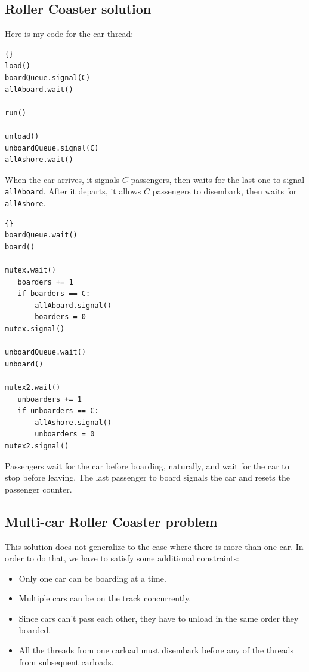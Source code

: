 \documentclass{book}
\newcommand{\clearemptydoublepage}{\newpage\cleardoublepage}
\begin{document}
\clearemptydoublepage
\subsection{Roller Coaster solution}

Here is my code for the car thread:

\begin{lstlisting}[caption={Roller Coaster solution (car)}]{}
load()
boardQueue.signal(C)
allAboard.wait()

run()

unload()
unboardQueue.signal(C)
allAshore.wait()
\end{lstlisting}

When the car arrives, it signals $C$ passengers,
then waits for the last one to signal {\tt allAboard}.
After it departs, it allows $C$ passengers to disembark,
then waits for {\tt allAshore}.

\begin{lstlisting}[caption={Roller Coaster solution (passenger)}]{}
boardQueue.wait()
board()

mutex.wait()
   boarders += 1
   if boarders == C:
       allAboard.signal()
       boarders = 0
mutex.signal()

unboardQueue.wait()
unboard()

mutex2.wait()
   unboarders += 1
   if unboarders == C:
       allAshore.signal()
       unboarders = 0
mutex2.signal()
\end{lstlisting}

Passengers wait for the car before boarding, naturally, and wait for
the car to stop before leaving.  The last passenger to board signals
the car and resets the passenger counter.


\clearemptydoublepage
\subsection{Multi-car Roller Coaster problem}

This solution does not generalize to the case where there is more
than one car.  In order to do that, we have to satisfy some additional
constraints:

\begin{itemize}

\item Only one car can be boarding at a time.

\item Multiple cars can be on the track concurrently.

\item Since cars can't pass each other, they have to unload
in the same order they boarded.

\item All the threads from one carload must disembark before
any of the threads from subsequent carloads.

\end{itemize}
\end{document}
